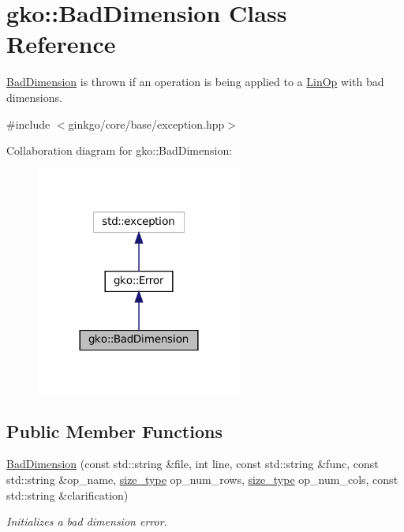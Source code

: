 \hypertarget{classgko_1_1BadDimension}{}\section{gko\+:\+:Bad\+Dimension Class Reference}
\label{classgko_1_1BadDimension}


\hyperlink{classgko_1_1BadDimension}{Bad\+Dimension} is thrown if an operation is being applied to a \hyperlink{classgko_1_1LinOp}{Lin\+Op} with bad dimensions.  




{\ttfamily \#include $<$ginkgo/core/base/exception.\+hpp$>$}



Collaboration diagram for gko\+:\+:Bad\+Dimension\+:
\nopagebreak
\begin{figure}[H]
\begin{center}
\leavevmode
\includegraphics[width=192pt]{classgko_1_1BadDimension__coll__graph}
\end{center}
\end{figure}
\subsection*{Public Member Functions}
\begin{DoxyCompactItemize}
\item 
\hyperlink{classgko_1_1BadDimension_a774454482004beac61bd983f74f446c3}{Bad\+Dimension} (const std\+::string \&file, int line, const std\+::string \&func, const std\+::string \&op\+\_\+name, \hyperlink{namespacegko_a6e5c95df0ae4e47aab2f604a22d98ee7}{size\+\_\+type} op\+\_\+num\+\_\+rows, \hyperlink{namespacegko_a6e5c95df0ae4e47aab2f604a22d98ee7}{size\+\_\+type} op\+\_\+num\+\_\+cols, const std\+::string \&clarification)
\begin{DoxyCompactList}\small\item\em Initializes a bad dimension error. \end{DoxyCompactList}\end{DoxyCompactItemize}



